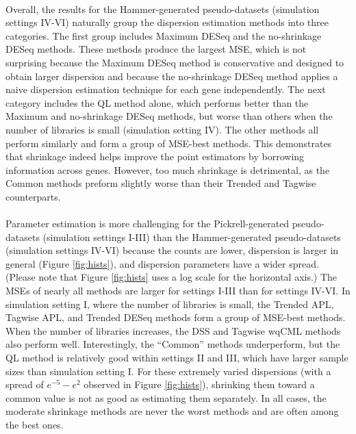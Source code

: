 \documentclass[10pt]{article}
\begin{document}
\paragraph{} \indent Overall, the results for the Hammer-generated pseudo-datasets (simulation settings IV-VI) naturally group the dispersion estimation methods into three categories. The first group includes Maximum DESeq and the no-shrinkage DESeq methods. These methods produce the largest MSE, which is not surprising because the Maximum DESeq method is conservative and designed to obtain larger dispersion and because the no-shrinkage DESeq method applies a naive dispersion estimation technique for each gene independently. The next category includes the QL method alone, which performs better than the Maximum and no-shrinkage DESeq methods, but worse than others when the number of libraries is small (simulation setting IV). The other methods all perform similarly and form a group of MSE-best methods. This demonstrates that shrinkage indeed helps improve the point estimators by borrowing information across genes. However, too much shrinkage is detrimental, as the Common methods preform slightly worse than their Trended and Tagwise counterparts.

\paragraph{} \indent Parameter estimation is more challenging for the Pickrell-generated pseudo-datasets (simulation settings I-III) than the Hammer-generated pseudo-datasets (simulation settings IV-VI) because the counts are lower, dispersion is larger in general (Figure \ref{fig:hists}), and dispersion parameters have a wider spread. (Please note that Figure \ref{fig:hists} uses a log scale for the horizontal axis.) The MSEs of nearly all methods are larger for settings I-III than for settings IV-VI. In simulation setting I, where the number of libraries is small, the Trended APL, Tagwise APL, and Trended DESeq methods form a group of MSE-best methods. When the number of libraries increases, the DSS and Tagwise wqCML methods also perform well. Interestingly, the ``Common'' methods underperform, but the QL method is relatively good within settings II and III, which have larger sample sizes than simulation setting I. For these extremely varied dispersions (with a spread of $e^{-5}-e^2$ observed in Figure \ref{fig:hists}), shrinking them toward a common value is not as good as estimating them separately. In all cases, the moderate shrinkage methods are never the worst methods and are often among the best ones.
\end{document}
